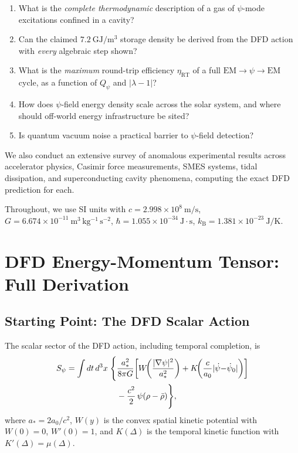 \documentclass[aps,prd,twocolumn,showpacs,preprintnumbers,superscriptaddress,nofootinbib]{revtex4-2}
\newcommand{\astar}{a_*}
\newcommand{\Wfunc}{W}
\newcommand{\mufunction}{\mu}
\newcommand{\psidot}{\dot{\psi}}
\newcommand{\kB}{k_{\mathrm{B}}}
\newcommand{\Qpsi}{Q_\psi}
\begin{document}
\begin{enumerate}
\item What is the \emph{complete thermodynamic} description of a gas
of $\psi$-mode excitations confined in a cavity?

\item Can the claimed $7.2~\mathrm{GJ/m^3}$ storage density be derived
from the DFD action with \emph{every} algebraic step shown?

\item What is the \emph{maximum} round-trip efficiency
$\eta_{\mathrm{RT}}$ of a full $\mathrm{EM}\to\psi\to\mathrm{EM}$
cycle, as a function of $\Qpsi$ and $|\lambda-1|$?

\item How does $\psi$-field energy density scale across the solar
system, and where should off-world energy infrastructure be sited?

\item Is quantum vacuum noise a practical barrier to $\psi$-field
detection?
\end{enumerate}

We also conduct an extensive survey of anomalous experimental results
across accelerator physics, Casimir force measurements, SMES systems,
tidal dissipation, and superconducting cavity phenomena, computing the
exact DFD prediction for each.

Throughout, we use SI units with $c = 2.998 \times 10^8~\mathrm{m/s}$,
$G = 6.674 \times 10^{-11}~\mathrm{m^3\,kg^{-1}\,s^{-2}}$,
$\hbar = 1.055 \times 10^{-34}~\mathrm{J\cdot s}$,
$\kB = 1.381 \times 10^{-23}~\mathrm{J/K}$.

\section{DFD Energy-Momentum Tensor: Full Derivation}\label{sec:emt}

\subsection{Starting Point: The DFD Scalar Action}\label{sec:action}

The scalar sector of the DFD action, including temporal completion, is
\begin{align}\label{eq:action-full}
S_\psi = \int dt\,d^3x\;\Biggl\{
  &\frac{\astar^2}{8\pi G}\biggl[
    \Wfunc\!\biggl(\frac{|\nabla\psi|^2}{\astar^2}\biggr)
    + K\!\biggl(\frac{c}{a_0}|\psidot{-}\psidot_0|\biggr)
  \biggr] \notag\\
  &- \frac{c^2}{2}\,\psi(\rho - \bar\rho)
\Biggr\},
\end{align}
where $\astar = 2a_0/c^2$, $\Wfunc(y)$ is the convex spatial kinetic
potential with $\Wfunc(0) = 0$, $\Wfunc'(0)=1$, and $K(\Delta)$ is the
temporal kinetic function with $K'(\Delta) = \mufunction(\Delta)$.
\end{document}
